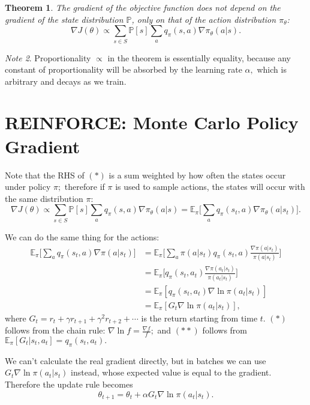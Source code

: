 \documentclass[17pt]{extarticle}
\theoremstyle{plain}
\newtheorem{theorem}{Theorem}
\theoremstyle{definition}
\theoremstyle{remark}
\newtheorem{note}[theorem]{Note}
\newcommand{\hE}{\mathbb E}
\newcommand{\hP}{\mathbb P}
\newcommand{\0}{\varnothing}
\newcommand{\<}{\langle}
\renewcommand{\>}{\rangle}
\begin{document}
\begin{theorem}
The gradient of the objective function does not depend on the gradient of the state distribution $ \hP $, only on that of the action distribution $ \pi_\theta $:
\[
\nabla J(\theta) \propto \sum_{s\in S} \hP[s] \sum_{a} q_\pi(s, a) \nabla \pi_\theta(a|s). \tag{$ * $}
\]
\end{theorem}

\begin{note}
  Proportionality $ \propto $ in the theorem is essentially equality, because any constant of proportionality will be absorbed by the learning rate $ \alpha, $ which is arbitrary and decays as we train.
\end{note}

\section{REINFORCE: Monte Carlo Policy Gradient}

Note that the RHS of $ (*) $ is a sum weighted by how often the states occur under policy $ \pi; $ therefore if $ \pi $ is used to sample actions, the states will occur with the same distribution $ \pi $:
$$
\nabla J(\theta) \propto \sum_{s\in S} \hP[s] \sum_{a} q_\pi(s, a) \nabla \pi_\theta(a|s) = \hE_\pi \big[ \sum_{a} q_\pi(s_t, a) \nabla \pi_\theta(a|s_t) \big].
$$

We can do the same thing for the actions: \begin{align*}
\hE_\pi \big[ \sum_{a} q_\pi(s_t, a) \nabla \pi(a|s_t) \big] &= \hE_\pi \Big[ \sum_{a} \pi(a|s_t) q_\pi(s_t, a) \frac{\nabla \pi(a|s_t)}{\pi(a|s_t)} \Big] \\
&= \hE_\pi \Big[ q_\pi(s_t, a_t) \frac{\nabla \pi(a_t|s_t)}{\pi(a_t|s_t)} \Big] \\
&= \hE_\pi [ q_\pi(s_t, a_t) \nabla \ln \pi(a_t|s_t) ] \tag{$ * $}\\
&= \hE_\pi [ G_t \nabla \ln \pi(a_t|s_t) ] \tag{$ ** $},
\end{align*}
where $ G_t = r_t + \gamma r_{t+1} + \gamma^2 r_{t+2} + \cdots $ is the return starting from time $ t. $ $ (*) $ follows from the chain rule: $ \nabla \ln f = \frac{\nabla f}{f}; $ and $ (**) $ follows from $ \hE_\pi [ G_t | s_t, a_t ] = q_\pi(s_t, a_t). $

We can't calculate the real gradient directly, but in batches we can use $ G_t \nabla \ln \pi(a_t|s_t) $ instead, whose expected value is equal to the gradient. Therefore the update rule becomes $$
\theta_{t+1} = \theta_t + \alpha G_t \nabla \ln \pi(a_t|s_t).
$$
\end{document}
